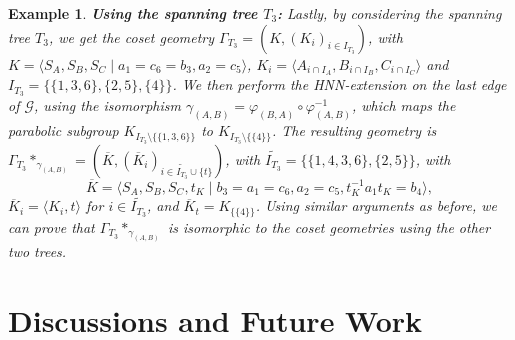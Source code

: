 \documentclass[11pt,letterpaper]{amsart}
\newtheorem{example}[prop]{Example}
\newcommand{\GG}{\mathcal{G}}
\begin{document}
\begin{example}
\textbf{Using the spanning tree $T_3$:} Lastly, by considering the spanning tree $T_3$, we get the coset geometry $\Gamma_{T_3}=(K,(K_i)_{i\in I_{T_3}})$, with $K=\langle S_A,S_B,S_C\mid a_1 = c_6=b_3, a_2=c_5 \rangle$, $K_i = \langle A_{i\cap I_A}, B_{i\cap I_B}, C_{i\cap I_C}\rangle$ and $I_{T_3}=\{\{1,3,6\},\{2,5\},\{4\}\}$.
We then perform the HNN-extension on the last edge of $\GG$, using the isomorphism $\gamma_{(A,B)}=\varphi_{(B,A)}\circ\varphi_{(A,B)}^{-1}$, which maps the parabolic subgroup $K_{I_{T_3}\setminus\{\{1,3,6\}\}}$ to $K_{I_{T_3}\setminus\{\{4\}\}}$.
The resulting geometry is $\Gamma_{T_3}*_{\gamma_{(A,B)}}=(\overline{K},(\overline{K}_i)_{i\in \widetilde{I_{T_3}}\cup \{t\}})$, with $\widetilde{I_{T_3}}= \{\{1,4,3,6\},\{2,5\}\}$, with $$\overline{K}=\langle S_A, S_B, S_C,t_K \mid b_3 = a_1 = c_6, a_2=c_{5},  t_K^{-1}a_{1}t_K=b_4\rangle,$$ $\overline{K}_i=\langle K_i,t\rangle$ for $i\in \widetilde{I_{T_3}}$, and $\overline{K}_t=K_{\{\{4\}\}}$.
Using similar arguments as before, we can prove that $\Gamma_{T_3}*_{\gamma_{(A,B)}}$ is isomorphic to the coset geometries using the other two trees.

\end{example}




\section{Discussions and Future Work}\label{sec:future}
\end{document}
